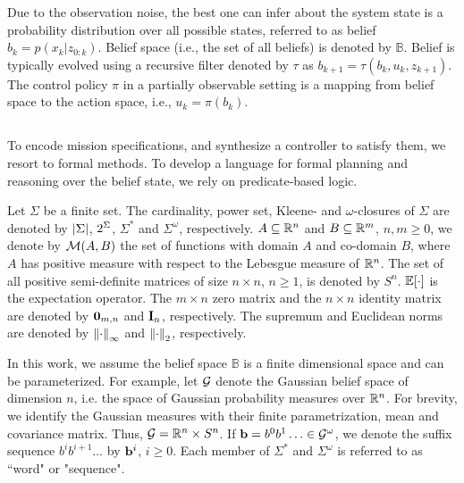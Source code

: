 \documentclass[conference]{IEEEtran}
\begin{document}
	
	Due to the observation noise, the best one can infer about the system state is a probability distribution over all possible states, referred to as belief $b_k=p(x_k|z_{0:k})$. Belief space (i.e., the set of all beliefs) is denoted by $\mathbb{B}$. Belief is typically evolved using a recursive filter denoted by $\tau$ as $b_{k+1}=\tau(b_k,u_k,z_{k+1})$. The control policy $\pi$ in a partially observable setting is a mapping from belief space to the action space, i.e., $u_k=\pi(b_k)$. 
    
    
	\subsection{\DTL}\label{sec:DTL}
    To encode mission specifications, and synthesize a controller to satisfy them, we resort to formal methods. To develop a language for formal planning and reasoning over the belief state, we rely on predicate-based logic.
    
    
    Let $\Sigma$ be a finite set. The cardinality,
    power set, Kleene- and $\omega$-closures
    of $\Sigma$ are denoted by $\left| {\Sigma} \right|$,
    $2^{\Sigma}$, $\Sigma^*$ and $\Sigma^\omega$,
    respectively.
    $A \subseteq \mathbb{R}^n$ and $B \subseteq \mathbb{R}^m$,
    $n, m \geq 0$, we denote by $\mathcal{M}(A, B)$ the set of
    functions with domain $A$ and co-domain $B$, where $A$ has positive measure with
    respect to the Lebesgue measure of $\mathbb{R}^n$.
    The set of all positive semi-definite matrices of size
    $n \times n$, $n \geq 1$, is denoted by $S^n$.
    $\mathbb{E}[\cdot]$ is the expectation operator.
    The $m \times n$ zero matrix and
    the $n \times n$ identity matrix are denoted by
    $\mathbf{0}_{m, n}$ and $\mathbf{I}_n$, respectively.
    The supremum and Euclidean norms are denoted by
    $\left\| {\cdot} \right\|_{\infty}$ and $\left\| {\cdot} \right\|_{2}$, respectively.
    
    In this work, we assume the belief space $\mathbb{B}$ is  a finite dimensional space and can be parameterized. For example, let $\mathcal{G}$ denote the Gaussian belief space
    of dimension $n$, i.e. the space of Gaussian
    probability measures over $\mathbb{R}^n$.
    For brevity, we identify the Gaussian measures
    with their finite parametrization, mean and
    covariance matrix. Thus,
    $\mathcal{G} =  \mathbb{R}^n \times  S^n$.
    If $\mathbf{b} = b^0b^1 \ldots \in \mathcal{G}^{\omega}$,
    we denote the suffix sequence $b^i b^{i+1} \ldots$ by
    $\mathbf{b}^i$, $i \geq 0$. Each member of $\Sigma^*$ and $\Sigma^\omega$ is referred to as ``word" or "sequence". 
    
\end{document}
